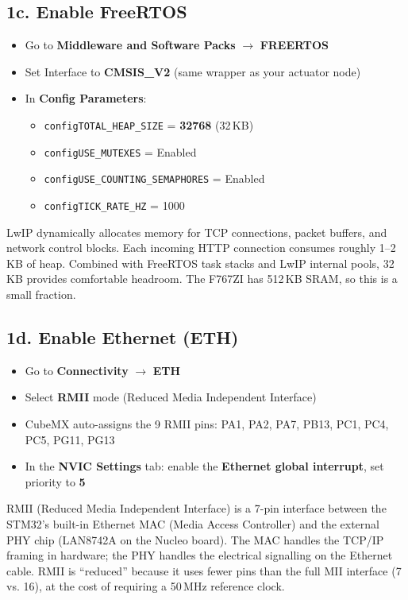 \documentclass[11pt,a4paper]{article}
\begin{document}
\subsection{1c. Enable FreeRTOS}
\begin{itemize}[leftmargin=2em]
  \item Go to \textbf{Middleware and Software Packs} $\rightarrow$ \textbf{FREERTOS}
  \item Set Interface to \textbf{CMSIS\_V2} (same wrapper as your actuator node)
  \item In \textbf{Config Parameters}:
  \begin{itemize}
    \item \texttt{configTOTAL\_HEAP\_SIZE} = \textbf{32768} (32\,KB)
    \item \texttt{configUSE\_MUTEXES} = Enabled
    \item \texttt{configUSE\_COUNTING\_SEMAPHORES} = Enabled
    \item \texttt{configTICK\_RATE\_HZ} = 1000
  \end{itemize}
\end{itemize}

\begin{infobox}
LwIP dynamically allocates memory for TCP connections, packet buffers, and network control blocks. Each incoming HTTP connection consumes roughly 1--2\,KB of heap. Combined with FreeRTOS task stacks and LwIP internal pools, 32\,KB provides comfortable headroom. The F767ZI has 512\,KB SRAM, so this is a small fraction.
\end{infobox}

\subsection{1d. Enable Ethernet (ETH)}
\begin{itemize}[leftmargin=2em]
  \item Go to \textbf{Connectivity} $\rightarrow$ \textbf{ETH}
  \item Select \textbf{RMII} mode (Reduced Media Independent Interface)
  \item CubeMX auto-assigns the 9 RMII pins: PA1, PA2, PA7, PB13, PC1, PC4, PC5, PG11, PG13
  \item In the \textbf{NVIC Settings} tab: enable the \textbf{Ethernet global interrupt}, set priority to \textbf{5}
\end{itemize}

\begin{infobox}
RMII (Reduced Media Independent Interface) is a 7-pin interface between the STM32's built-in Ethernet MAC (Media Access Controller) and the external PHY chip (LAN8742A on the Nucleo board). The MAC handles the TCP/IP framing in hardware; the PHY handles the electrical signalling on the Ethernet cable. RMII is ``reduced'' because it uses fewer pins than the full MII interface (7 vs. 16), at the cost of requiring a 50\,MHz reference clock.
\end{infobox}
\end{document}
